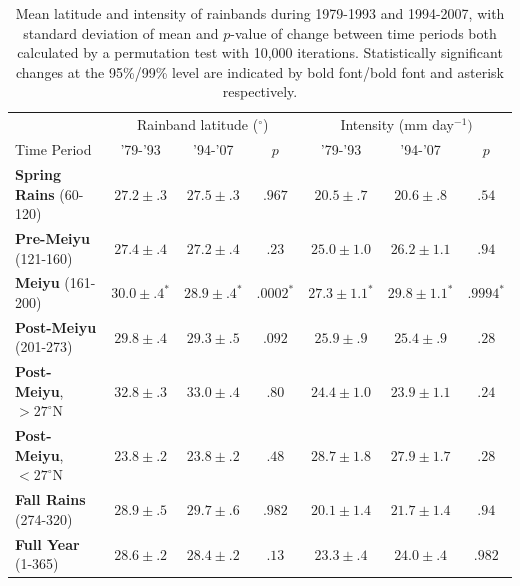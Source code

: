 \documentclass{ametsoc}
\begin{document}
\begin{table}

\centering

\caption{Mean latitude and intensity of rainbands during 1979-1993 and 1994-2007, with standard deviation of mean and $p$-value of change between time periods both calculated by a permutation test with 10,000 iterations. Statistically significant changes at the 95\%/99\% level are indicated by bold font/bold font and asterisk respectively.}

\begin{tabular}{ l c c c c c c}
	& \multicolumn{3}{c}{Rainband latitude ($^\circ$)} & \multicolumn{3}{c}{Intensity (mm day$^{-1})$} \\
	Time Period & '79-'93 & '94-'07 & $p$ & '79-'93 & '94-'07 & $p$ \\
	\hline	
	\textbf{Spring Rains} (60-120)		& $27.2 \pm .3 $ & $27.5 \pm .3 $ & $ .967 $ 	& $20.5 \pm .7$ 	& $20.6 \pm .8 	$ & $.54$ \\
	\textbf{Pre-Meiyu} (121-160) 		& $27.4 \pm .4 $ & $27.2 \pm .4$ & $ .23 $ 	& $25.0 \pm 1.0$ 	& $26.2 \pm 1.1	$ & $.94$ \\
	\textbf{Meiyu} (161-200)			& $\boldsymbol{30.0 \pm .4^*}$ & $\boldsymbol{28.9 \pm .4^*}$ & $\boldsymbol{.0002^*}$ & $\boldsymbol{27.3 \pm 1.1^*}$ 	& $\boldsymbol{29.8 \pm 1.1^*}$  & $\boldsymbol{.9994 ^*}$ \\
	\textbf{Post-Meiyu} (201-273)		& $29.8 \pm .4 $ & $29.3 \pm .5 $ & $ .092 $	& $25.9 \pm .9$ 	& $25.4 \pm .9	$ & $.28$ \\
	\textbf{Post-Meiyu}, $>27^\circ$N 	& $32.8 \pm .3 $ & $33.0 \pm .4 $ & $ .80 $ 	& $24.4 \pm 1.0$ 	& $23.9 \pm 1.1	$ & $.24$ \\
	\textbf{Post-Meiyu}, $<27^\circ$N 	& $23.8 \pm .2 $ & $23.8 \pm .2 $ & $ .48 $ 	& $28.7 \pm 1.8$ 	& $27.9 \pm 1.7	$ & $.28$  \\
	\textbf{Fall Rains} (274-320)			& $\boldsymbol{28.9 \pm .5} $ & $\boldsymbol{29.7 \pm .6} $ & $ \boldsymbol{.982} $ 	& $20.1 \pm 1.4$ 	& $21.7 \pm 1.4	$ & $.94$ \\
	\textbf{Full Year} (1-365)			& $28.6 \pm .2 $ & $28.4 \pm .2 $ & $ .13 $ 	& $\boldsymbol{23.3 \pm .4}$ 	& $\boldsymbol{24.0 \pm .4}	$ & $\boldsymbol{.982}$ \\

\end{tabular}
\label{tab:t38}
\end{table}
\end{document}
